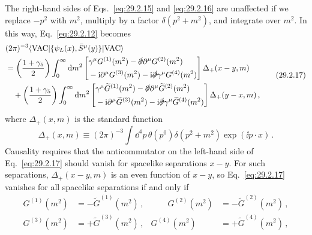 The right-hand sides of Eqs.~\eqref{eq:29.2.15} and
\eqref{eq:29.2.16} are unaffected if we replace \(-p^2\) with \(m^2\),
multiply by a factor \(\delta(p^2+m^2)\), and integrate over \(m^2\).
In this way, Eq.~\eqref{eq:29.2.12} becomes
\begin{equation}
  \begin{aligned}
  &(2\pi)^{-3}
  \langle\mathrm{VAC}\lvert
    \{\psi_L(x),\bar S^\mu(y)\}
  \rvert\mathrm{VAC}\rangle
  \\
  &=
  \left(\frac{1+\gamma_5}{2}\right)
  \int_0^\infty \mathop{}\!\mathrm{d} m^2
  \left[
  \begin{aligned}
    &\gamma^\mu G^{(1)}(m^2)
    -\slashed{\partial}\partial^\mu G^{(2)}(m^2)
    \\
    &-\mathrm{i}\partial^\mu G^{(3)}(m^2)
    -\mathrm{i}\slashed{\partial}\gamma^\mu G^{(4)}(m^2)
  \end{aligned}
  \right]\Delta_+(x-y,m)
  \\
  &\quad+
  \left(\frac{1+\gamma_5}{2}\right)
  \int_0^\infty \mathop{}\!\mathrm{d} m^2
  \left[
  \begin{aligned}
    &\gamma^\mu\widetilde G^{(1)}(m^2)
    -\slashed{\partial}\partial^\mu\widetilde G^{(2)}(m^2)
    \\
    &-\mathrm{i}\partial^\mu\widetilde G^{(3)}(m^2)
    -\mathrm{i}\slashed{\partial}\gamma^\mu\widetilde G^{(4)}(m^2)
  \end{aligned}
  \right]\Delta_+(y-x,m)\,,
  \end{aligned}
  \tag{29.2.17}\label{eq:29.2.17}
\end{equation}
where \(\Delta_+(x,m)\) is the standard function
\begin{equation}
  \Delta_+(x,m)
  \equiv
  (2\pi)^{-3}\int \dd^4p\,
  \theta(p^0)\delta(p^2+m^2)\exp(\ii p\mathbin{\cdot}x)\,.
  \tag{29.2.18}\label{eq:29.2.18}
\end{equation}
Causality requires that the anticommutator on the left-hand side of
Eq.~\eqref{eq:29.2.17} should vanish for spacelike separations \(x-y\).
For such separations, \(\Delta_+(x-y,m)\) is an even function of \(x-y\),
so Eq.~\eqref{eq:29.2.17} vanishes for all spacelike separations if and
only if
\begin{equation}
  \begin{aligned}
  G^{(1)}(m^2)&=-\widetilde G^{(1)}(m^2)\,,
  &\qquad
  G^{(2)}(m^2)&=-\widetilde G^{(2)}(m^2)\,,
  \\
  G^{(3)}(m^2)&=+\widetilde G^{(3)}(m^2)\,,
  &
  G^{(4)}(m^2)&=+\widetilde G^{(4)}(m^2)\,,
  \end{aligned}
  \tag{29.2.19}\label{eq:29.2.19}
\end{equation}
